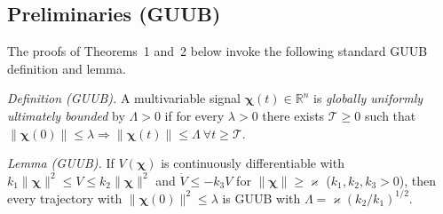 \documentclass[10pt,journal]{IEEEtran}
\begin{document}
\subsection{Preliminaries (GUUB)}
\label{sup:preliminaries}
The proofs of Theorems~1 and~2 below invoke the following standard GUUB definition and lemma.

\textit{Definition (GUUB).}\label{sup:guub_def} A multivariable signal $\boldsymbol{\chi}(t)\in\mathbb{R}^n$ is \emph{globally uniformly ultimately bounded} by $\Lambda>0$ if for every $\lambda>0$ there exists $\mathcal{T}\ge 0$ such that $\|\boldsymbol{\chi}(0)\|\le\lambda\Rightarrow\|\boldsymbol{\chi}(t)\|\le\Lambda\ \forall t\ge\mathcal{T}$.

\textit{Lemma (GUUB).}\label{sup:guub_lemma} If $V(\boldsymbol{\chi})$ is continuously differentiable with $k_1\|\boldsymbol{\chi}\|^2\le V\le k_2\|\boldsymbol{\chi}\|^2$ and $\dot{V}\le -k_3 V$ for $\|\boldsymbol{\chi}\|\ge\varkappa$ ($k_1,k_2,k_3>0$), then every trajectory with $\|\boldsymbol{\chi}(0)\|^2\le\lambda$ is GUUB with $\Lambda = \varkappa(k_2/k_1)^{1/2}$.
\end{document}
